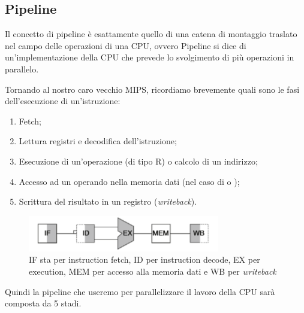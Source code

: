 \documentclass[class=book, crop=false, oneside]{standalone}
\begin{document}
\subsection*{Pipeline}
Il concetto di pipeline è esattamente quello di una catena di montaggio traslato nel campo delle operazioni di una CPU, ovvero Pipeline si dice di un'implementazione della CPU che prevede lo svolgimento di più operazioni in parallelo.

Tornando al nostro caro vecchio MIPS, ricordiamo brevemente quali sono le fasi dell'esecuzione di un'istruzione:
\begin{enumerate}[noitemsep]
	\item Fetch;
	\item Lettura registri e decodifica dell'istruzione;
	\item Esecuzione di un'operazione (di tipo R) o calcolo di un indirizzo;
	\item Accesso ad un operando nella memoria dati (nel caso di  o );
	\item Scrittura del risultato in un registro (\emph{writeback}).
\end{enumerate}
\begin{figure}
	\centering
	\includegraphics[width=.5\textwidth,keepaspectratio]{istruzione.png}
	\caption{IF sta per instruction fetch, ID per instruction decode, EX per execution, MEM per accesso alla memoria dati e WB per \emph{writeback}}
\end{figure}

Quindi la pipeline che useremo per parallelizzare il lavoro della CPU sarà composta da 5 stadi.
\end{document}
